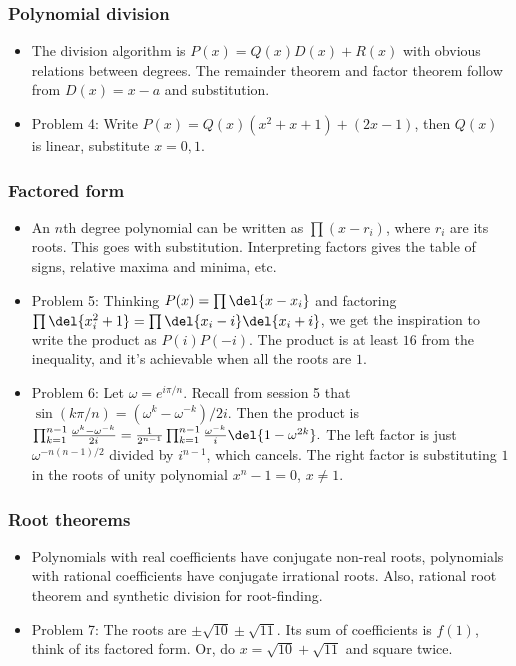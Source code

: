 \documentclass[10pt,paper=letter]{scrartcl}
\begin{document}
\subsubsection*{Polynomial division}

\begin{itemize}
  \item The division algorithm is $P(x) = Q(x)D(x) + R(x)$ with obvious relations between degrees. The remainder theorem and factor theorem follow from $D(x) = x-a$ and substitution.
  \item Problem 4: Write $P(x) = Q(x)(x^2 + x + 1) + (2x - 1)$, then $Q(x)$ is linear, substitute $x = 0, 1$.
\end{itemize}

\subsubsection*{Factored form}

\begin{itemize}
  \item An $n$th degree polynomial can be written as $\prod(x-r_i)$, where $r_i$ are its roots. This goes with substitution. Interpreting factors gives the table of signs, relative maxima and minima, etc.
  \item Problem 5: Thinking $P(x) = \prod\del{x - x_i}$ and factoring $\prod\del{x_i^2 + 1} = \prod \del{x_i - i}\del{x_i + i}$, we get the inspiration to write the product as $P(i)P(-i)$. The product is at least $16$ from the inequality, and it's achievable when all the roots are $1$.
  \item Problem 6: Let $\omega = e^{i\pi/n}$. Recall from session 5 that $\sin(k\pi/n) = (\omega^k - \omega^{-k})/2i$. Then the product is $\prod_{k = 1}^{n-1}\frac{\omega^k - \omega^{-k}}{2i} = \frac1{2^{n-1}}\prod_{k=1}^{n-1} \frac{\omega^{-k}}{i}\del{1 - \omega^{2k}}.$ The left factor is just $\omega^{-n(n-1)/2}$ divided by $i^{n-1}$, which cancels. The right factor is substituting $1$ in the roots of unity polynomial $x^n - 1 = 0$, $x \neq 1$.
\end{itemize}

\subsubsection*{Root theorems}

\begin{itemize}
  \item Polynomials with real coefficients have conjugate non-real roots, polynomials with rational coefficients have conjugate irrational roots. Also, rational root theorem and synthetic division for root-finding.
  \item Problem 7: The roots are $\pm\sqrt{10}\pm\sqrt{11}$. Its sum of coefficients is $f(1)$, think of its factored form. Or, do $x = \sqrt{10} + \sqrt{11}$ and square twice.
\end{itemize}
\end{document}
